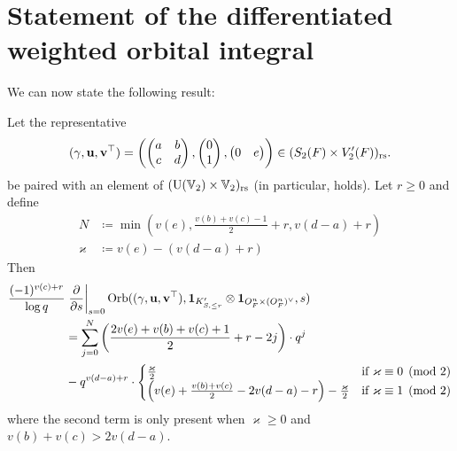 \section{Statement of the differentiated weighted orbital integral}
We can now state the following result:
\begin{theorem}
  \label{thm:semi_lie_derivative_single}
  Let the representative
  \[
    {(\gamma, \mathbf u, \mathbf v^\top)} = \left( \begin{pmatrix} a & b \\ c & d \end{pmatrix},
      \begin{pmatrix} 0 \\ 1 \end{pmatrix},
      \begin{pmatrix} 0 & e \end{pmatrix} \right)
    \in (S_2(F) \times V_2'(F))_{\mathrm{rs}}.
  \]
  be paired with an element of $(\operatorname{U}(\mathbb V_2) \times \mathbb V_2)_{\mathrm{rs}}$
  (in particular,  holds).
  Let $r \ge 0$ and define
  \begin{align*}
    N &\coloneqq \min\left( v(e), \frac{v(b)+v(c)-1}{2} + r, v(d-a) + r \right) \\
    \varkappa &\coloneqq v(e) - (v(d-a)+r)
  \end{align*}
  Then
  \begin{align*}
    \frac{(-1)^{v(c)+r}}{\log q}
    &\left. \pdv{}{s} \right\rvert_{s=0}
    \operatorname{Orb}({(\gamma, \mathbf u, \mathbf v^\top)}, \mathbf{1}_{K'_{S, \le r}} \otimes \mathbf{1}_{O_F^n \times (O_F^n)^\vee}, s) \\
    &= \sum_{j=0}^N \left( \frac{2v(e)+v(b)+v(c)+1}{2} + r - 2j \right) \cdot q^j \\
    & - q^{v(d-a)+r} \cdot
    \begin{cases}
      \frac{\varkappa}{2} & \text{if }\varkappa \equiv 0 \pmod 2 \\
      \left( v(e)+\frac{v(b)+v(c)}{2}-2v(d-a)-r \right) - \frac{\varkappa}{2}
      & \text{if }\varkappa \equiv 1 \pmod 2 \\
    \end{cases}
  \end{align*}
  where the second term is only present when $\varkappa \ge 0$ and $v(b)+v(c)>2v(d-a)$.
\end{theorem}

